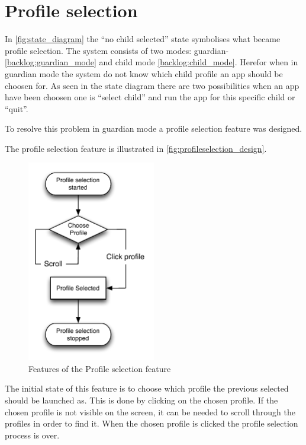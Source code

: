 \section{Profile selection}
\label{design:profile_selection}
In \autoref{fig:state_diagram} the ``no child selected'' state symbolises what became profile selection. The \giraf[] system consists of two modes: guardian- \autoref{backlog:guardian_mode} and child mode \autoref{backlog:child_mode}. Herefor when in guardian mode the system do not know which child profile an app should be choosen for. As seen in the state diagram there are two possibilities when an app have been choosen one is ``select child'' and run the app for this specific child or ``quit''.


To resolve this problem in guardian mode a profile selection feature was designed.

The profile selection feature is illustrated in \autoref{fig:profileselection_design}. 
\label{design:profile_selection}
\begin{figure}[h]
	\centering
	\includegraphics[width=0.5\textwidth]{gfx/profileselect_design.pdf}
	\caption{Features of the Profile selection feature}
	\label{fig:profileselection_design}
\end{figure}

The initial state of this feature is to choose which profile the previous selected should be launched as. This is done by clicking on the chosen profile. If the chosen profile is not visible on the screen, it can be needed to scroll through the profiles in order to find it. When the chosen profile is clicked the profile selection process is over.